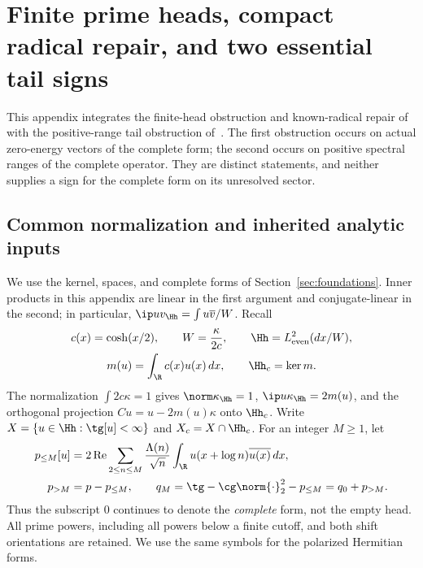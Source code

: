 \section{Finite prime heads, compact radical repair, and two essential tail signs}
\label{vfourA:sec:prime-obstruction}

This appendix integrates the finite-head obstruction and known-radical repair
of~\cite{vfourPrimeHead} with the positive-range tail obstruction
of~\cite{vfourPositiveRange}.  The first obstruction occurs on actual
zero-energy vectors of the complete form; the second occurs on positive
spectral ranges of the complete operator.  They are distinct statements,
and neither supplies a sign for the complete form on its unresolved sector.

\subsection{Common normalization and inherited analytic inputs}
\label{vfourA:subsec:inputs}

We use the kernel, spaces, and complete forms of
Section~\ref{sec:foundations}.  Inner products in this appendix are linear
in the first argument and conjugate-linear in the second; in particular,
$\ip uv_{\Hh}=\int u\overline v/W$.  Recall
\[
 \begin{gathered}
 c(x)=\cosh(x/2),\qquad W=\frac{\kappa}{2c},\qquad
 \Hh=L^2_{\mathrm{even}}(dx/W),\\
 m(u)=\int_\R c(x)u(x)\,dx,\qquad \Hh_c=\ker m.
 \end{gathered}
\]
The normalization $\int2c\kappa=1$ gives
$\norm\kappa_{\Hh}=1$, $\ip u\kappa_{\Hh}=2m(u)$, and the orthogonal
projection $Cu=u-2m(u)\kappa$ onto $\Hh_c$.  Write
$X=\{u\in\Hh:\tg[u]<\infty\}$ and $X_c=X\cap\Hh_c$.
For an integer $M\ge1$, let
\begin{align}
 p_{\le M}[u]&=2\operatorname{Re}\sum_{2\le n\le M}
 \frac{\Lambda(n)}{\sqrt n}
 \int_\R u(x+\log n)\overline{u(x)}\,dx,\label{vfourA:eq:head}\\
 p_{>M}&=p-p_{\le M},\qquad
 q_M=\tg-\cg\norm{\cdot}_2^2-p_{\le M}
     =q_0+p_{>M}.\label{vfourA:eq:head-complete}
\end{align}
Thus the subscript $0$ continues to denote the \emph{complete} form, not
the empty head.  All prime powers, including all powers below a finite
cutoff, and both shift orientations are retained.  We use the same symbols
for the polarized Hermitian forms.


